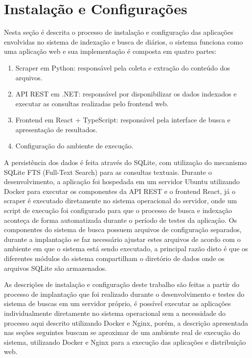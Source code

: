 
\section{Instalação e Configurações}

Nesta seção é descrita o processo de instalação e configuração das aplicações envolvidas no sistema de indexação e busca de diários, o sistema funciona como uma aplicação web e sua implementação é composta em quatro partes:

\begin{enumerate}
    \item Scraper em Python: responsável pela coleta e extração do conteúdo dos arquivos.
    \item API REST em .NET: responsável por disponibilizar os dados indexados e executar as consultas realizadas pelo frontend web.
    \item Frontend em React + TypeScript: responsável pela interface de busca e apresentação de resultados.
    \item Configuração do ambiente de execução.
\end{enumerate}

A persistência dos dados é feita através do SQLite, com utilização do mecanismo SQLite FTS (Full-Text Search) para as consultas textuais. Durante o desenvolvimento, a aplicação foi hospedada em um servidor Ubuntu utilizando Docker para executar os componentes da API REST e o frontend React, já o scraper é executado diretamente no sistema operacional do servidor, onde um script de execução foi configurado para que o processo de busca e indexação aconteça de forma automatizada durante o período de testes da aplicação. Os componentes do sistema de busca possuem arquivos de configuração separados, durante a implantação se faz necessário ajustar estes arquivos de acordo com o ambiente em que o sistema está sendo executado, a principal razão disto é que os diferentes módulos do sistema compartilham o diretório de dados onde os arquivos SQLite são armazenados.

As descrições de instalação e configuração deste trabalho são feitas a partir do processo de implantação que foi realizado durante o desenvolvimento e testes do sistema de buscas em um servidor próprio, é possível executar as aplicações individualmente diretamente no sistema operacional sem a necessidade do processo aqui descrito utilizando Docker e Nginx, porém, a descrição apresentada nas seções seguintes buscam se aproximar de um ambiente real de execução do sistema, utilizando Docker e Nginx para a execução das aplicações e distribuição web.

